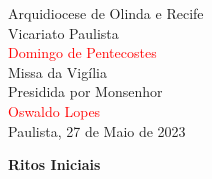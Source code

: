\documentclass{book}
\begin{document}
\pagestyle{empty}

\begin{center}

    \huge Arquidiocese de Olinda e Recife
    \vspace{.3cm} \\
    \LARGE Vicariato Paulista
    \vspace{3cm} \\
    \textcolor{red}{\Huge Domingo de Pentecostes}
    \vspace{3cm} \\
    \huge Missa da Vigília
    \vspace{.3cm} \\
    \LARGE Presidida por Monsenhor
    \vspace{.3cm} \\
    \textcolor{red}{\Huge Oswaldo Lopes}
    \vspace{\fill}\\
    \LARGE Paulista, 27 de Maio de 2023

\end{center}

\newpage

\begin{center}

    \textbf{Ritos Iniciais}

\end{center}
\end{document}
